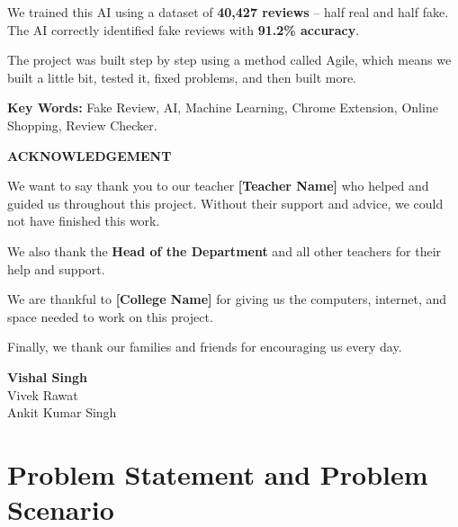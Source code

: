 \documentclass[10pt, a4paper]{report}
\begin{document}
We trained this AI using a dataset of \textbf{40,427 reviews} -- half real and half fake. The AI correctly identified fake reviews with \textbf{91.2\% accuracy}.

The project was built step by step using a method called Agile, which means we built a little bit, tested it, fixed problems, and then built more.

\vspace{0.5cm}
\textbf{Key Words:} Fake Review, AI, Machine Learning, Chrome Extension, Online Shopping, Review Checker.

\newpage
\begin{center}
  {\Large\bfseries\color{myblue} ACKNOWLEDGEMENT}
\end{center}
\vspace{0.5cm}
\onehalfspacing

We want to say thank you to our teacher \textbf{[Teacher Name]} who helped and guided us throughout this project. Without their support and advice, we could not have finished this work.

We also thank the \textbf{Head of the Department} and all other teachers for their help and support.

We are thankful to \textbf{[College Name]} for giving us the computers, internet, and space needed to work on this project.

Finally, we thank our families and friends for encouraging us every day.

\vspace{1.5cm}
\begin{flushright}
  \textbf{Vishal Singh} \\ Vivek Rawat \\ Ankit Kumar Singh
\end{flushright}

\newpage
\tableofcontents
\newpage
\listoffigures
\newpage
\listoftables

\chapter{Problem Statement and Problem Scenario}
\end{document}
